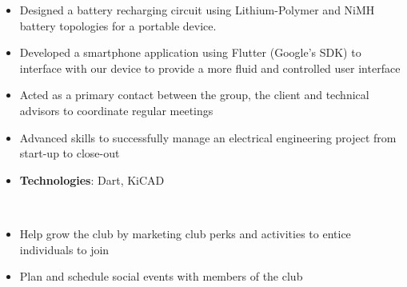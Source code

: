 \documentclass[10pt, letterpaper, ragged2e, withhyper]{altacv}
\begin{document}
\begin{paracol}{2}
            
    
    \begin{itemize}
        \item Designed a battery recharging circuit using Lithium-Polymer and NiMH battery topologies for a portable device. 
        \item Developed a smartphone application using Flutter (Google's SDK) to interface with our device to provide a more fluid and controlled user interface
        \item Acted as a primary contact between the group, the client and technical advisors to coordinate regular meetings 
        \item Advanced skills to successfully manage an electrical engineering project from start-up to close-out
        \item \textbf{Technologies}: Dart, KiCAD
    \end{itemize}

\switchcolumn

     \\







    \begin{itemize}
        \item Help grow the club by marketing club perks and activities to entice individuals to join
        \item Plan and schedule social events with members of the club
    \end{itemize}


\end{paracol}
\end{document}
